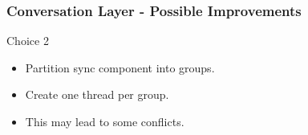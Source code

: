 \documentclass[compress,xcolor=dvipsnames,10pt]{beamer}
\begin{document}
\begin{frame}
\frametitle{Conversation Layer - Possible Improvements}
\begin{block}{Choice 2}
\begin{itemize}
\item Partition sync component into groups. 
\item Create one thread per group. 
\item This may lead to some conflicts. 
\end{itemize}
\end{block}
\end{frame}

\newcommand{\goesto}[1][]{\stackrel{#1}{\longrightarrow}} %
\newcommand{\ngoesto}[1][]{\stackrel{#1}{\not\longrightarrow}} %
\newcommand{\arrow}[2]  {\xrightarrow[{\scriptsize #2}]{{\scriptsize #1}}}

\end{document}
